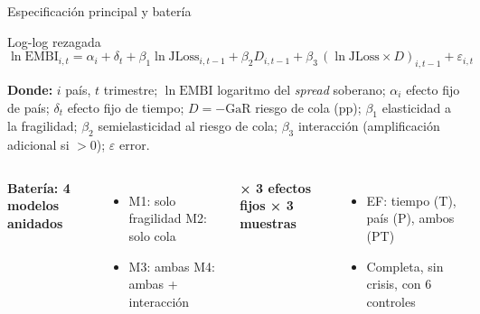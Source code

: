 \documentclass[aspectratio=169]{beamer}
\newcommand{\JLoss}{\mathrm{JLoss}}
\newcommand{\GaR}{\mathrm{GaR}}
\newcommand{\EMBI}{\mathrm{EMBI}}
\begin{document}
\begin{frame}{Especificación principal y batería}
\begin{block}{Log-log rezagada}
\vspace{-6pt}
\[
\ln\EMBI_{i,t}=\alpha_i+\delta_t+\beta_1\ln\JLoss_{i,t-1}+\beta_2D_{i,t-1}+\beta_3\,(\ln\JLoss\times D)_{i,t-1}+\varepsilon_{i,t}
\]
\vspace{-8pt}
\end{block}
{\scriptsize \textbf{Donde:} $i$ país, $t$ trimestre; $\ln\EMBI$ logaritmo del \textit{spread} soberano; $\alpha_i$ efecto fijo de país; $\delta_t$ efecto fijo de tiempo; $D=-\GaR$ riesgo de cola (pp); $\beta_1$ elasticidad a la fragilidad; $\beta_2$ semielasticidad al riesgo de cola; $\beta_3$ interacción (amplificación adicional si $>0$); $\varepsilon$ error.\par}
\vspace{4pt}
\begin{columns}[T]
\small
\textbf{Batería: 4 modelos anidados}
\begin{itemize}
\item M1: solo fragilidad \quad M2: solo cola
\item M3: ambas \quad M4: ambas + interacción
\end{itemize}
\small
\textbf{× 3 efectos fijos × 3 muestras}
\begin{itemize}
\item EF: tiempo (T), país (P), ambos (PT)
\item Completa, sin crisis, con 6 controles
\end{itemize}
\end{columns}
\end{frame}
\end{document}
